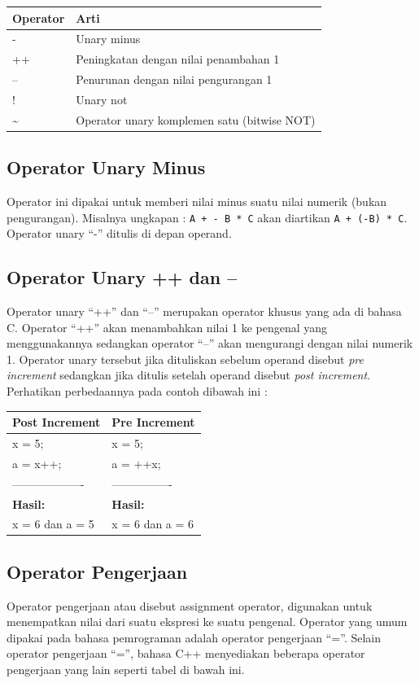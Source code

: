 \begin{longtable}[]{@{}ll@{}}
\toprule
Operator & Arti\tabularnewline
\midrule
\endhead
- & Unary minus\tabularnewline
++ & Peningkatan dengan nilai penambahan 1\tabularnewline
-- & Penurunan dengan nilai pengurangan 1\tabularnewline
! & Unary not\tabularnewline
\textasciitilde{} & Operator unary komplemen satu (bitwise
NOT)\tabularnewline
\bottomrule
\end{longtable}

\subsection{Operator Unary Minus}\label{b-operator-unary-minus}

Operator ini dipakai untuk memberi nilai minus suatu nilai numerik
(bukan pengurangan). Misalnya ungkapan : \texttt{A\ +\ -\ B\ *\ C} akan
diartikan \texttt{A\ +\ (-B)\ *\ C}. Operator unary ``-'' ditulis di
depan operand.

\subsection{Operator Unary ++ dan --}\label{c-operator-unary-dan}

Operator unary ``++'' dan ``--'' merupakan operator khusus yang ada di
bahasa C. Operator ``++'' akan menambahkan nilai 1 ke pengenal yang
menggunakannya sedangkan operator ``--'' akan mengurangi dengan nilai
numerik 1. Operator unary tersebut jika dituliskan sebelum operand
disebut \emph{pre increment} sedangkan jika ditulis setelah operand
disebut \emph{post increment}. Perhatikan perbedaannya pada contoh
dibawah ini :

\begin{longtable}[]{@{}ll@{}}
\toprule
Post Increment & Pre Increment\tabularnewline
\midrule
\endhead
x = 5; & x = 5;\tabularnewline
a = x++; & a = ++x;\tabularnewline
------------------- & ----------------\tabularnewline
\textbf{Hasil:} & \textbf{Hasil:}\tabularnewline
x = 6 dan a = 5 & x = 6 dan a = 6\tabularnewline
\bottomrule
\end{longtable}

\subsection{Operator Pengerjaan}\label{d-operator-pengerjaan}

Operator pengerjaan atau disebut assignment operator, digunakan untuk
menempatkan nilai dari suatu ekspresi ke suatu pengenal. Operator yang
umum dipakai pada bahasa pemrograman adalah operator pengerjaan ``=''.
Selain operator pengerjaan ``='', bahasa C++ menyediakan beberapa
operator pengerjaan yang lain seperti tabel di bawah ini.

